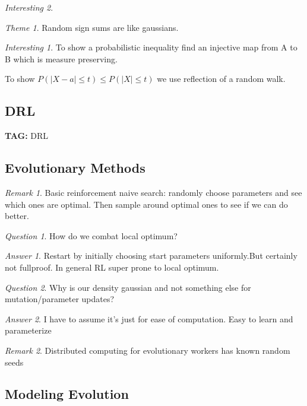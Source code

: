 \documentclass[11pt]{article}
\theoremstyle{remark}
\newtheorem{remark}{Remark}
\newtheorem{quest}{Question}
\newtheorem{ans}{Answer}
\newtheorem{interest}{Interesting}
\newtheorem{theme}{Theme}
\begin{document}
\begin{interest}
\begin{theme}
	Random sign sums are like gaussians. 
\end{theme}

\begin{interest}
	To show a probabilistic inequality find an injective map from A to B which is measure preserving. 

	To show $P(|X-a| \leq t) \leq P(|X| \leq t)$ we use reflection of a random walk.
\end{interest}

\subsection{DRL}

\textbf{TAG:} DRL

\subsection{Evolutionary Methods}

\begin{remark}
	Basic reinforcement naive search: randomly choose parameters and see which ones are optimal. Then sample around optimal ones to see if we can do better.
\end{remark}

\begin{quest}
	How do we combat local optimum?
\end{quest}

\begin{ans}
	Restart by initially choosing start parameters uniformly.But certainly not fullproof. In general RL super prone to local optimum.
\end{ans}

\begin{quest}
	Why is our density gaussian and not something else for mutation/parameter updates?
\end{quest}

\begin{ans}
	 I have to assume it's just for ease of computation. Easy to learn and parameterize
\end{ans}

\begin{remark}
	Distributed computing for evolutionary workers has known random seeds
\end{remark}

\subsection{Modeling Evolution}


\end{interest}
\end{document}
